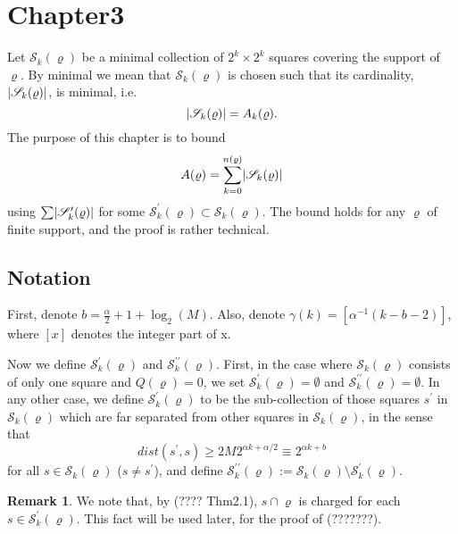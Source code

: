 \documentclass[11pt,reqno]{article}
\DeclarePairedDelimiter\abs{\lvert}{\rvert}%
\theoremstyle{definition}
\newtheorem*{remark}{Remark}
\numberwithin{equation}{section}
\begin{document}
\section{Chapter3}\label{sec:chap3}
\newcommand*{\SqrsSet}{\mathscr{S}_k(\varrho)}
\newcommand*{\SqrsSetTag}{\mathscr{S}^\prime_k(\varrho)}
\newcommand*{\SqrsSetDtag}{\mathscr{S}^{\prime\prime}_k(\varrho)}
\newcommand*{\SqrsSetGamma}{\mathscr{S}_{\gamma(k)}(\varrho)}
\newcommand*{\SqrsSetTagGamma}{\mathscr{S}^\prime_{\gamma(k)}(\varrho)}
\newcommand*{\SqrsSetDtagGamma}{\mathscr{S}^{\prime\prime}_{\gamma(k)}(\varrho)}

\newcommand*{\SqrsSetOf}[2]{\mathscr{S}_{#1}(#2)}
\newcommand*{\SqrsSetTagOf}[2]{\mathscr{S}^\prime_{#1}(#2)}


Let $\SqrsSet$ be a minimal collection of $2^k\times2^k$ squares covering the support of $\varrho$. By minimal we mean that $\SqrsSet$ is chosen such that its cardinality, $\abs{\SqrsSet}$, is minimal, i.e. 
$$\abs{\SqrsSet} = A_k(\varrho).$$
The purpose of this chapter is to bound 
$$
A(\varrho) = \sum_{k=0}^{n(\varrho)} \abs{\SqrsSet}
$$
using $\sum \abs{\SqrsSetTag}$ for some $\SqrsSetTag \subset \SqrsSet$. The bound holds for any $\varrho$ of finite support, and the proof is rather technical.

\subsection{Notation}



First, denote $b = \frac{\alpha}{2} + 1 + \log_2(M)$. Also, denote $\gamma(k)=[\alpha^{-1}(k-b-2)]$, where $[x]$ denotes the integer part of x. 


Now we define $\SqrsSetTag$ and $\SqrsSetDtag$.
First, in the case where $\SqrsSet$ consists of only one square and $Q(\varrho)=0$, we set $\SqrsSetTag=\emptyset$ and $\SqrsSetDtag=\emptyset$.
In any other case, we define $\SqrsSetTag$ to be the sub-collection of those squares $s^\prime$ in $\SqrsSet$ which are far separated from other squares in $\SqrsSet$, in the sense that 
\begin{equation} \label{label:eq33}
dist(s^\prime, s)\geq 2M2^{\alpha k + \alpha /2}\equiv2^{\alpha k + b}
\end{equation}
for all $s\in\SqrsSet$ ($s\neq s^\prime$), and define $\SqrsSetDtag := \SqrsSet \setminus \SqrsSetTag$.

\begin{remark}
We note that, by (???? Thm2.1), $s\cap\varrho$ is charged for each $s\in\SqrsSetTag$. This fact will be used later, for the proof of (???????).
\end{remark}
\end{document}
